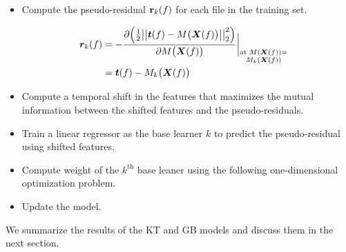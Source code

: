 \documentclass{article}
\begin{document}
\begin{itemize}
\item Compute the pseudo-residual ${\bf r}_k(f)$ for each file in the training set. 	

\begin{equation} \label{pseudores}
\begin{aligned}
\hspace{-3mm}\bm r_k(f) &= - { \frac {\partial \Big({\frac{1}{2}\big|\big|\bm t(f) - M\big(\bm X(f)\big)\big|\big|^2_2}\Big)} {\partial M\big(\bm X(f)\big)} \bigg|}_{\substack{{\text{at }M(\bm X(f)) =} \\ {M_k(\bm X(f))}}}\\
&= \bm t(f) - M_k\big( \bm X(f) \big)
\end{aligned}
\end{equation}

\item Compute a temporal shift in the features that maximizes the mutual information between the shifted features and the pseudo-residuals.

\item Train a linear regressor as the base learner $k$ to predict the pseudo-residual using shifted features.

\item Compute weight of the $k^\text{th}$ base leaner using the following one-dimensional optimization problem.

\item Update the model. 

\end{itemize}

We summarize the results of the KT and GB models and discuss them in the next section.

%
\end{document}
